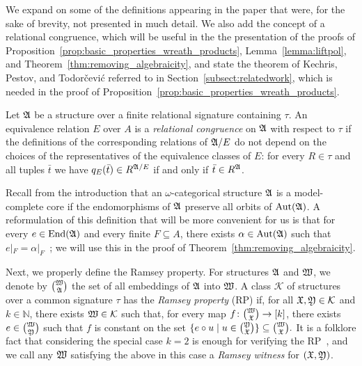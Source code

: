  We expand on some of the definitions appearing in the paper that were, for the sake of brevity, not presented in much detail.
%
We also add the concept of a relational congruence, which will be useful in the
the presentation of the proofs of Proposition~\ref{prop:basic_properties_wreath_products}, Lemma~\ref{lemma:liftpol}, and Theorem~\ref{thm:removing_algebraicity}, and state the theorem of  
Kechris, Pestov, and Todor\v{c}evi\'{c} referred to in Section~\ref{subsect:relatedwork}, which is needed in the proof of Proposition~\ref{prop:basic_properties_wreath_products}. 
% 

Let $\mathfrak{A}$ be a structure over a finite relational signature containing $\tau$.
%
An equivalence relation $E$ over $A$ is a \emph{relational congruence} on $\mathfrak{A}$ with respect to $\tau$ if the definitions of the corresponding relations of $\mathfrak{A}/E$ do not depend on the choices of the representatives of the equivalence classes of $E$:  for every $R\in \tau$ and all tuples $\bar{t}$ we have $q_E(\bar{t})\in R^{\mathfrak{A}/{E}}$ if and only if $\bar{t}\in R^{\mathfrak{A}}$. 

Recall from the introduction that an $\omega$-categorical structure $\mathfrak{A}$ is a model-complete core if the endomorphisms of $\mathfrak{A}$ preserve all orbits of $\mathrm{Aut}(\mathfrak{A})$.
%
A reformulation of this definition that will be more convenient for us is that for every $e\in \mathrm{End}(\mathfrak{A})$ and every finite $F\subseteq A$, there exists $\alpha \in \mathrm{Aut}(\mathfrak{A})$ such that $e|_F=\alpha|_F$~\cite{bodirsky2021complexity}; we will use this  in the proof of Theorem~\ref{thm:removing_algebraicity}.

Next, we properly define the Ramsey property.
%
For structures $\mathfrak{A}$ and $\mathfrak{W}$, we denote by $\binom{\mathfrak{W}}{\mathfrak{A}}$ the set of all embeddings of $\mathfrak{A}$ into $\mathfrak{W}$.
%
A class $\mathcal{K}$ of structures over a common signature $\tau$ has the \emph{Ramsey property} (RP) if,  for all $\mathfrak{X},\mathfrak{Y}\in \mathcal{K}$ and $k\in \mathbb{N}$, there exists $\mathfrak{W}\in \mathcal{K}$ such that, for every map $f\colon \smash{\binom{\mathfrak{W}}{\mathfrak{X}}} \rightarrow [k]$, there exists $e\in \smash{\binom{\mathfrak{W}}{\mathfrak{Y}}}$ such that $f$ is constant on the set $\{e\circ u\;|\; u\in \textstyle\smash{\binom{\mathfrak{Y}}{\mathfrak{X}}}\} \subseteq \textstyle\smash{\binom{\mathfrak{W}}{\mathfrak{X}}}.$
% 
It is a folklore fact that considering the special case $k=2$ is enough for verifying the RP~\cite{hubickanesetril2019}, and we call any  $\mathfrak{W}$ satisfying the above in this case a \emph{Ramsey witness} for $(\mathfrak{X},\mathfrak{Y})$.  

